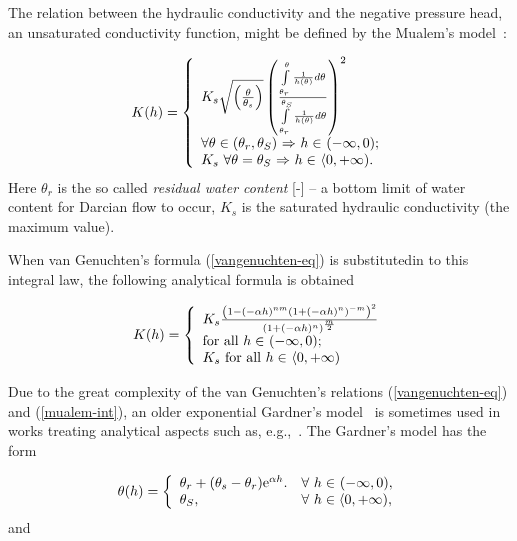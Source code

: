 \documentclass[final,3p,times,twocolumn]{elsarticle}
\begin{document}
The relation between the hydraulic conductivity and the negative pressure head, an 
unsaturated conductivity function, might be defined by the Mualem's model~\cite{mualem}:

  \begin{equation}
  \label{mualem-int}
  K(h) = \left\{
    \begin{array}{l l}
     K_s \sqrt{ \left( \frac{\theta}{\theta_s} \right)} \left( \frac{\int\limits_{\theta_r}^{\theta} \frac{1}{h(\theta)}d \theta }{\int\limits_{\theta_r}^{\theta_S} \frac{1}{h(\theta)} d \theta} \right)^2  \\
    \mbox{$\forall \theta \in (\theta_r, \theta_S )$ $\Rightarrow$ $h \in$ $(-\infty,0)$}; \\
    K_s \ \mbox{$\forall \theta= \theta_S $  $\Rightarrow$  $h \in$ $\langle 0, +\infty)$}.\\
    \end{array} \right.
    \end{equation}
Here $\theta_r$ is the so called {\em residual water content} [-] -- a bottom 
limit of water content for Darcian flow to occur, $K_s$ is the saturated 
hydraulic conductivity (the maximum value).


When van Genuchten's formula (\ref{vangenuchten-eq}) is substitutedin to this integral 
law, the following analytical formula is obtained

  \begin{equation}
  \label{mualem-anal}
  K(h) = \left\{
    \begin{array}{l l}
    K_s \frac{\left( 1- (-\alpha h)^{nm} \left( 1+ (-\alpha h)^n \right)^{-m} \right)^2}{\left(1+(-\alpha h)^n \right)^{\frac{m}{2}}} \\
    \mbox{for all $h \in$ $(-\infty,0)$};\\
    K_s  \ \mbox{for all $h \in$ $\langle 0, +\infty)$}\\
    \end{array} \right.
    \end{equation}

Due to the great complexity of the van Genuchten's relations (\ref{vangenuchten-eq}) 
and (\ref{mualem-int}), an older exponential Gardner's model~\cite{gardner} 
is sometimes used in works treating analytical aspects such as, e.g.,~\cite{tracy1,tracy2}. 
The Gardner's model has the form

\begin{equation}
\label{gardner-theta}
\theta (h) = \left\{ 
\begin{array}{l l}
 \theta_r + (\theta_s -\theta_r)\textrm{e}^{\alpha h}. & \mbox{$\forall$  $h \in$ $(-\infty,0)$},\\
  \theta_S, & \mbox{$\forall$ $h \in \langle 0, + \infty )$},
\end{array} \right.
\end{equation}
and 
\end{document}
